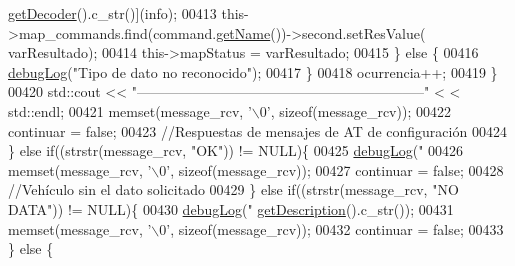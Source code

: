 \begin{DoxyCode}
{{{{{{{{{{{      \hyperlink{classCommands_a8b4c2a655d8dd3de334338d6684d469c}{getDecoder}().c\_str()](info);
00413                                     this->map\_commands.find(command.\hyperlink{classCommands_adf3d8a96310b1f4e57a6ecf0f2f153ea}{getName}())->second.setResValue(
      varResultado);
00414                                     this->mapStatus = varResultado;
00415                                 \} \textcolor{keywordflow}{else} \{
00416                                     \hyperlink{debug_8hpp_a55f41cf7b0585224496de3d7adbc101c}{debugLog}(\textcolor{stringliteral}{"Tipo de dato no reconocido"});
00417                                 \}
00418                                 ocurrencia++;
00419                             \}
00420                             std::cout << \textcolor{stringliteral}{"--------------------------------------------------------------"} <
      < std::endl;
00421                             memset(message\_rcv, \textcolor{charliteral}{'\(\backslash\)0'}, \textcolor{keyword}{sizeof}(message\_rcv));
00422                             continuar = \textcolor{keyword}{false};
00423                             \textcolor{comment}{//Respuestas de mensajes de AT de configuración}
00424                         \} \textcolor{keywordflow}{else} \textcolor{keywordflow}{if}((strstr(message\_rcv, \textcolor{stringliteral}{"OK"})) != NULL)\{
00425                             \hyperlink{debug_8hpp_a55f41cf7b0585224496de3d7adbc101c}{debugLog}(\textcolor{stringliteral}{"%
00426                             memset(message\_rcv, \textcolor{charliteral}{'\(\backslash\)0'}, \textcolor{keyword}{sizeof}(message\_rcv));                         
00427                             continuar = \textcolor{keyword}{false};
00428                             \textcolor{comment}{//Vehículo sin el dato solicitado}
00429                         \} \textcolor{keywordflow}{else} \textcolor{keywordflow}{if}((strstr(message\_rcv, \textcolor{stringliteral}{"NO DATA"})) != NULL)\{
00430                             \hyperlink{debug_8hpp_a55f41cf7b0585224496de3d7adbc101c}{debugLog}(\textcolor{stringliteral}{"%
      \hyperlink{classCommands_ad82fe7dfcf1908423bdb59d048020e26}{getDescription}().c\_str());
00431                             memset(message\_rcv, \textcolor{charliteral}{'\(\backslash\)0'}, \textcolor{keyword}{sizeof}(message\_rcv));                         
00432                             continuar = \textcolor{keyword}{false};
00433                         \} \textcolor{keywordflow}{else} \{
}}}}}}}}}}}}}
\end{DoxyCode}
